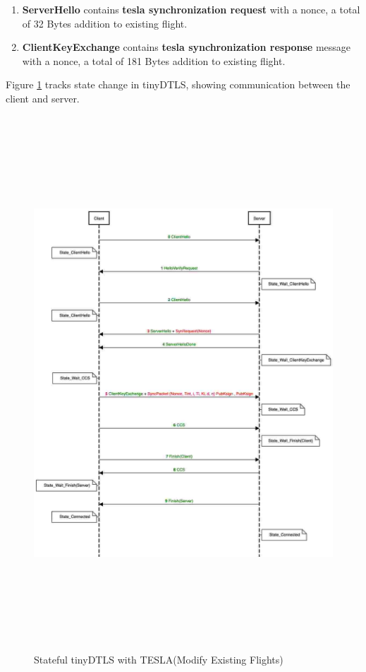 \begin{enumerate}
    \item \textbf{ServerHello} contains \textbf{tesla synchronization request} with a nonce, a total of 32 Bytes addition to existing flight.
    
    \item \textbf{ClientKeyExchange} contains \textbf{tesla synchronization response} message with a nonce, a total of 181 Bytes addition to existing flight.
    
\end{enumerate}  

Figure \ref{hs-tesla-state} tracks state change in tinyDTLS, showing communication between the client and server.



\begin{figure}[H]
    \centering
    \includegraphics[height=20cm,width=16cm]{figures/hs-tesla-state.jpg}
    \caption{Stateful tinyDTLS with TESLA(Modify Existing Flights)}
    \label{hs-tesla-state}
    \end{figure}
    
